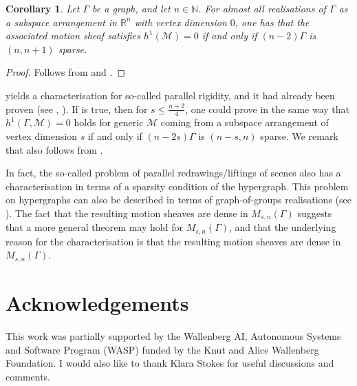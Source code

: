 \documentclass{article}
\newtheorem{corollary}[theorem]{Corollary}
\theoremstyle{definition}
\theoremstyle{remark}
\begin{document}
\begin{corollary}\label{parallel-graphs}
    Let $\Gamma$ be a graph, and let $n\in \mathbb{N}$. For almost all realisations of $\Gamma$ as a subspace arrangement in $\mathbb{R}^{n}$ with vertex dimension $0$, one has that the associated motion sheaf satisfies $h^{1}(\mathcal{M}) = 0$ if and only if $(n-2)\Gamma$ is $(n, n+1)$ sparse. 
\end{corollary}
\begin{proof}
    Follows from  and . 
\end{proof}

 yields a characterisation for so-called parallel rigidity, and it had already been proven (see \cite[Theorem 8.2.2]{Whiteley1996}, \cite[Theorem 6.5]{develin2007rigidity}). If  is true, then for $s\leq \frac{n+2}{4}$, one could prove in the same way that $h^{1}(\Gamma, \mathcal{M}) = 0$ holds for generic $\mathcal{M}$ coming from a subspace arrangement of vertex dimension $s$ if and only if $(n-2s) \Gamma$ is $(n-s, n)$ sparse. We remark that  also follows from .  

In fact, the so-called problem of parallel redrawings/liftings of scenes \cite{Whiteley1989} also has a characterisation in terms of a sparsity condition of the hypergraph. This problem on hypergraphs can also be described in terms of graph-of-groups realisations (see \cite[Section 4.3]{graphsofgroups}). The fact that the resulting motion sheaves are dense in $M_{s, n}(\Gamma)$ suggests that a more general theorem may hold for $M_{s,n}(\Gamma)$, and that the underlying reason for the characterisation is that the resulting motion sheaves are dense in $M_{s, n}(\Gamma)$.

\section{Acknowledgements}

This work was partially supported by the Wallenberg AI, Autonomous Systems and
Software Program (WASP) funded by the Knut and Alice Wallenberg Foundation. I would also like to thank Klara Stokes for useful discussions and comments. 


\end{document}
